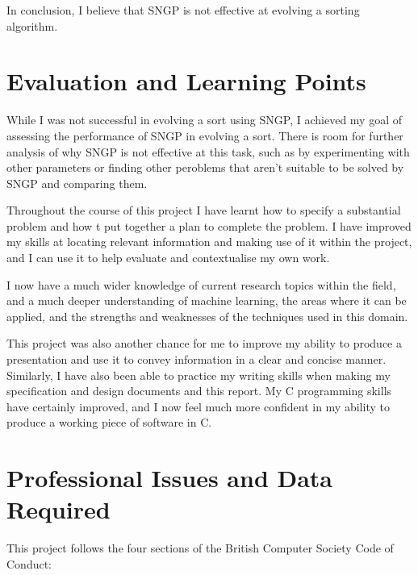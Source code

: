 \documentclass{article}
\begin{document}
    	In conclusion, I believe that SNGP is not effective at evolving a sorting algorithm.
        
    \section{Evaluation and Learning Points}
    
    	While I was not successful in evolving a sort using SNGP, I achieved my goal of  assessing the performance of SNGP in evolving a sort. There is room for further analysis of why SNGP is not effective at this task, such as by experimenting with other parameters or finding other peroblems that aren't suitable to be solved by SNGP and comparing them. 
    	
    	Throughout the course of this project I have learnt how to specify a substantial problem and how t put together a plan to complete the problem. I have improved my skills at locating relevant information and making use of it within the project, and I can use it to help evaluate and contextualise my own work.
    	
    	I now have a much wider knowledge of current research topics within the field, and a much deeper understanding of machine learning, the areas where it can be applied, and the strengths and weaknesses of the techniques used in this domain.
    	
    	This project was also another chance for me to improve my ability to produce a presentation and use it to convey information in a clear and concise manner. Similarly, I have also been able to practice my writing skills when making my specification and design documents and this report. My C programming skills have certainly improved, and I now feel much more confident in my ability to produce a working piece of software in C.
    	
    	

    \section{Professional Issues and Data Required}
    
    	This project follows the four sections of the British Computer Society Code of Conduct:
    	
\end{document}
